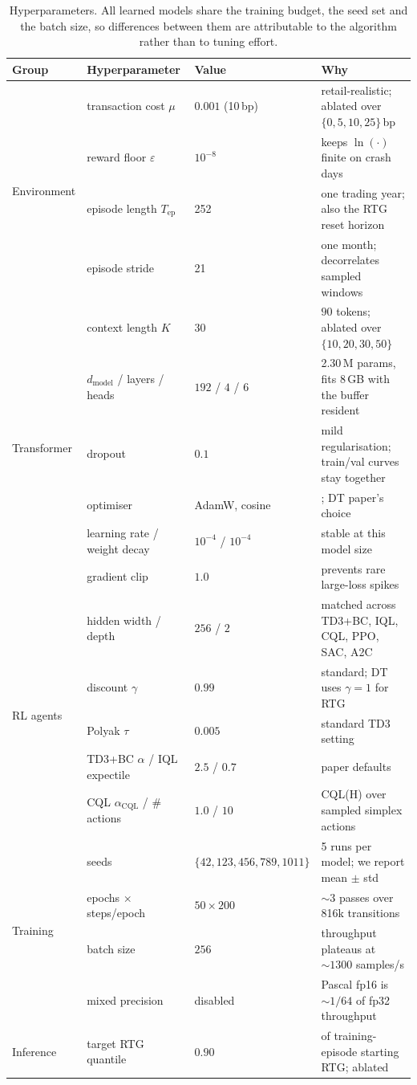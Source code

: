 \documentclass[11pt]{article}
\begin{document}
\begin{table}[t]
\centering
\caption{Hyperparameters. All learned models share the training budget, the seed set and the
batch size, so differences between them are attributable to the algorithm rather than to
tuning effort.}
\label{tab:hparams}
\small
\begin{tabular}{llll}
\toprule
\textbf{Group} & \textbf{Hyperparameter} & \textbf{Value} & \textbf{Why} \\
\midrule
\multirow{4}{*}{Environment}
 & transaction cost $\mu$ & $0.001$ (10\,bp) & retail-realistic; ablated over $\{0,5,10,25\}$\,bp \\
 & reward floor $\varepsilon$ & $10^{-8}$ & keeps $\ln(\cdot)$ finite on crash days \\
 & episode length $T_{\text{ep}}$ & 252 & one trading year; also the RTG reset horizon \\
 & episode stride & 21 & one month; decorrelates sampled windows \\
\midrule
\multirow{6}{*}{Transformer}
 & context length $K$ & 30 & $90$ tokens; ablated over $\{10,20,30,50\}$ \\
 & $d_{\text{model}}$ / layers / heads & $192$ / $4$ / $6$ & 2.30\,M params, fits 8\,GB with the buffer resident \\
 & dropout & $0.1$ & mild regularisation; train/val curves stay together \\
 & optimiser & AdamW, cosine & \cite{loshchilov2019decoupled}; DT paper's choice \\
 & learning rate / weight decay & $10^{-4}$ / $10^{-4}$ & stable at this model size \\
 & gradient clip & $1.0$ & prevents rare large-loss spikes \\
\midrule
\multirow{5}{*}{RL agents}
 & hidden width / depth & $256$ / $2$ & matched across TD3+BC, IQL, CQL, PPO, SAC, A2C \\
 & discount $\gamma$ & $0.99$ & standard; DT uses $\gamma=1$ for RTG \\
 & Polyak $\tau$ & $0.005$ & standard TD3 setting \\
 & TD3+BC $\alpha$ / IQL expectile & $2.5$ / $0.7$ & paper defaults \\
 & CQL $\alpha_{\text{CQL}}$ / \#\,actions & $1.0$ / $10$ & CQL(H) over sampled simplex actions \\
\midrule
\multirow{4}{*}{Training}
 & seeds & $\{42,123,456,789,1011\}$ & 5 runs per model; we report mean $\pm$ std \\
 & epochs $\times$ steps/epoch & $50 \times 200$ & ${\sim}3$ passes over 816k transitions \\
 & batch size & $256$ & throughput plateaus at ${\sim}1300$ samples/s \\
 & mixed precision & disabled & Pascal fp16 is ${\sim}1/64$ of fp32 throughput \\
\midrule
Inference & target RTG quantile & $0.90$ & of training-episode starting RTG; ablated \\
\bottomrule
\end{tabular}
\end{table}
\end{document}
